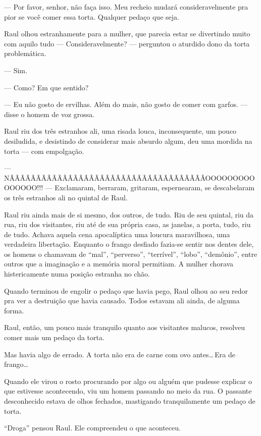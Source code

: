 --- Por favor, senhor, não faça isso. Meu recheio mudará consideravelmente pra pior se você comer essa torta. Qualquer pedaço que seja.

Raul olhou estranhamente para a mulher, que parecia estar se divertindo muito com aquilo tudo --- Consideravelmente? --- perguntou o aturdido dono da torta problemática.

--- Sim.

--- Como? Em que sentido?

--- Eu não gosto de ervilhas. Além do mais, não gosto de comer com garfos. --- disse o homem de voz grossa.

Raul riu dos três estranhos ali, uma risada louca, inconsequente, um pouco desiludida, e desistindo de considerar mais absurdo algum, deu uma mordida na torta --- com empolgação.

--- N\-Ã\-Ã\-Ã\-Ã\-Ã\-Ã\-Ã\-Ã\-Ã\-Ã\-Ã\-Ã\-Ã\-Ã\-Ã\-Ã\-Ã\-Ã\-Ã\-Ã\-Ã\-Ã\-ÃÃ\-Ã\-Ã\-Ã\-Ã\-Ã\-Ã\-Ã\-Ã\-Ã\-Ã\-Ã\-Ã\-Ã\-O\-O\-O\-O\-O\-O\-O\-O\-O\-O\-O\-O\-O\-O\-O!!! --- Exclamaram, berraram, gritaram, espernearam, se descabelaram os três estranhos ali no quintal de Raul.

Raul riu ainda mais de si mesmo, dos outros, de tudo. Riu de seu quintal, riu da rua, riu dos visitantes, riu até de sua própria casa, as janelas, a porta, tudo, riu de tudo. Achava aquela cena apocalíptica uma loucura maravilhosa, uma verdadeira libertação. Enquanto o frango desfiado fazia-se sentir nos dentes dele, os homens o chamavam de ``mal'', ``perverso'', ``terrível'', ``lobo'', ``demônio'', entre outros que a imaginação e a memória moral permitiam. A mulher chorava histericamente numa posição estranha no chão.

Quando terminou de engolir o pedaço que havia pego, Raul olhou ao seu redor pra ver a destruição que havia causado. Todos estavam ali ainda, de alguma forma.

Raul, então, um pouco mais tranquilo quanto aos visitantes malucos, resolveu comer mais um pedaço da torta.

Mas havia algo de errado. A torta não era de carne com ovo antes\ldots\,Era de frango\ldots

Quando ele virou o rosto procurando por algo ou alguém que pudesse explicar o que estivesse acontecendo, viu um homem passando no meio da rua. O passante desconhecido estava de olhos fechados, mastigando tranquilamente um pedaço de torta.

``Droga'' pensou Raul. Ele compreendeu o que aconteceu.

